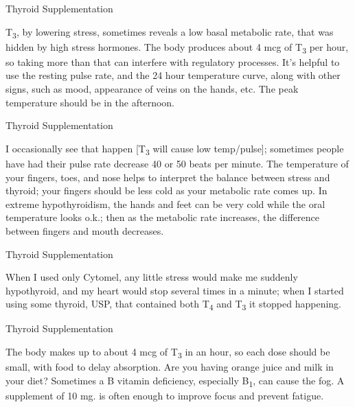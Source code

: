 \documentclass[11pt,oneside,openany,extrafontsizes]{memoir}
\begin{document}
\begin{standalonequote}{Thyroid Supplementation}

    \begin{answer}
        T\textsubscript{3}, by lowering stress, sometimes reveals a low basal metabolic rate, that was hidden by high stress hormones. The body produces about 4 mcg of T\textsubscript{3} per hour, so taking more than that can interfere with regulatory processes. It's helpful to use the resting pulse rate, and the 24 hour temperature curve, along with other signs, such as mood, appearance of veins on the hands, etc. The peak temperature should be in the afternoon.
    \end{answer}
\end{standalonequote}

\begin{standalonequote}{Thyroid Supplementation}

    \begin{answer}
        I occasionally see that happen [T\textsubscript{3} will cause low temp/pulse]; sometimes people have had their pulse rate decrease 40 or 50 beats per minute. The temperature of your fingers, toes, and nose helps to interpret the balance between stress and thyroid; your fingers should be less cold as your metabolic rate comes up. In extreme hypothyroidism, the hands and feet can be very cold while the oral temperature looks o.k.; then as the metabolic rate increases, the difference between fingers and mouth decreases.
    \end{answer}
\end{standalonequote}

\begin{standalonequote}{Thyroid Supplementation}

    \begin{answer}
        When I used only Cytomel, any little stress would make me suddenly hypothyroid, and my heart would stop several times in a minute; when I started using some thyroid, USP, that contained both T\textsubscript{4} and T\textsubscript{3} it stopped happening.
    \end{answer}
\end{standalonequote}

\begin{standalonequote}{Thyroid Supplementation}

    \begin{answer}
        The body makes up to about 4 mcg of T\textsubscript{3} in an hour, so each dose should be small, with food to delay absorption. Are you having orange juice and milk in your diet? Sometimes a B vitamin deficiency, especially B\textsubscript{1}, can cause the fog. A supplement of 10 mg. is often enough to improve focus and prevent fatigue.
    \end{answer}
\end{standalonequote}
\end{document}
